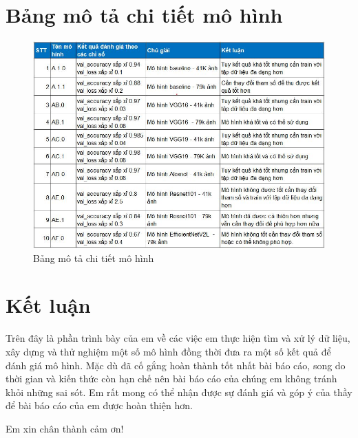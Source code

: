 \newpage     
{}

\section*{Bảng mô tả chi tiết mô hình}
\begin{center}
    \begin{figure}[!h]
        \centering
        \includegraphics[scale = 1]{fileanh/kqchitiet.jpg}
        \caption{Bảng mô tả chi tiết mô hình}
    \end{figure}
\end{center}



\newpage
{}

\section*{Kết luận}
Trên đây là phần trình bày của em về các việc em thực hiện tìm và xử lý dữ liệu, xây dựng và thử nghiệm một số mô hình đồng thời đưa ra một số kết quả để đánh giá mô hình. Mặc dù đã cố gắng hoàn thành tốt nhất bài báo cáo, song do thời gian và kiến thức còn hạn chế nên bài báo cáo của chúng em không tránh khỏi những sai sót. Em rất mong có thể nhận được sự đánh giá và góp ý của thầy để bài báo cáo của em được hoàn thiện hơn.

\indent Em xin chân thành cảm ơn!




